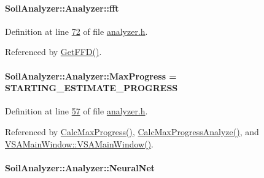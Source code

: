 \paragraph[{fft}]{ Soil\+Analyzer\+::\+Analyzer\+::fft\hspace{0.3cm}{\ttfamily [private]}}\label{class_soil_analyzer_1_1_analyzer_a5a88bb8ae9ce9a8a1e199f3760f9db48}


Definition at line \hyperlink{analyzer_8h_source_l00072}{72} of file \hyperlink{analyzer_8h_source}{analyzer.\+h}.



Referenced by \hyperlink{analyzer_8cpp_source_l00350}{Get\+F\+F\+D()}.

\hypertarget{class_soil_analyzer_1_1_analyzer_aef988b5c2c2349b544dabe8882c8931a}{}
\paragraph[{Max\+Progress}]{ Soil\+Analyzer\+::\+Analyzer\+::\+Max\+Progress = {\bf S\+T\+A\+R\+T\+I\+N\+G\+\_\+\+E\+S\+T\+I\+M\+A\+T\+E\+\_\+\+P\+R\+O\+G\+R\+E\+S\+S}}\label{class_soil_analyzer_1_1_analyzer_aef988b5c2c2349b544dabe8882c8931a}


Definition at line \hyperlink{analyzer_8h_source_l00057}{57} of file \hyperlink{analyzer_8h_source}{analyzer.\+h}.



Referenced by \hyperlink{analyzer_8cpp_source_l00112}{Calc\+Max\+Progress()}, \hyperlink{analyzer_8cpp_source_l00136}{Calc\+Max\+Progress\+Analyze()}, and \hyperlink{vsamainwindow_8cpp_source_l00004}{V\+S\+A\+Main\+Window\+::\+V\+S\+A\+Main\+Window()}.

\hypertarget{class_soil_analyzer_1_1_analyzer_a6ea3af4b49fef5b5f289bcc2046e615e}{}
\paragraph[{Neural\+Net}]{ Soil\+Analyzer\+::\+Analyzer\+::\+Neural\+Net}\label{class_soil_analyzer_1_1_analyzer_a6ea3af4b49fef5b5f289bcc2046e615e}


